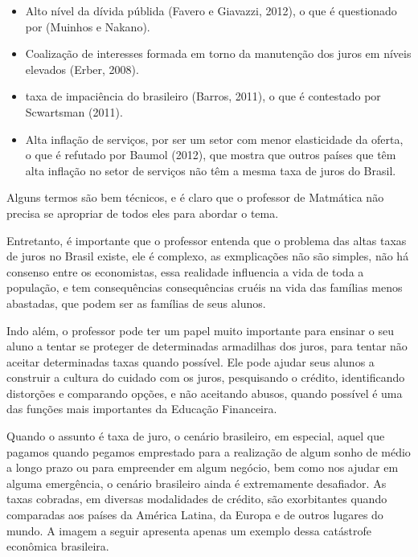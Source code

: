 \begin{paginatexto}
\begin{itemize}
  \item Alto nível da dívida públida (Favero e Giavazzi, 2012), o que é questionado por (Muinhos e Nakano).

  \item  Coalização de interesses formada em torno da manutenção dos juros em níveis elevados (Erber, 2008).

  \item taxa de impaciência do brasileiro (Barros, 2011), o que é contestado por Scwartsman (2011).

  \item Alta inflação de serviços, por ser um setor com menor elasticidade da oferta, o que é refutado por Baumol (2012), que mostra que outros países que têm alta inflação no setor de serviços não têm a mesma taxa de juros do Brasil.
\end{itemize}

Alguns termos são bem técnicos, e é claro que o professor de Matmática não precisa se apropriar de todos eles para abordar o tema.

Entretanto, é importante que o professor entenda que o problema das altas taxas de juros no Brasil existe, ele é complexo, as exmplicações não são simples, não há consenso entre os economistas, essa realidade influencia a vida de toda a população, e tem consequências consequências cruéis na vida das famílias menos abastadas, que podem ser as famílias de seus alunos.

Indo além, o professor pode ter um papel muito importante para ensinar o seu aluno a tentar se proteger de determinadas armadilhas dos juros, para tentar não aceitar determinadas taxas quando possível. Ele pode ajudar seus alunos a construir a cultura do cuidado com os juros, pesquisando o crédito, identificando distorções e comparando opções, e não aceitando abusos, quando possível é uma das funções mais importantes da Educação Financeira.

\end{paginatexto}

\def\currentcolor{session1}




Quando o assunto é taxa de juro, o cenário brasileiro, em  especial, aquel que pagamos quando pegamos emprestado para a realização de algum sonho de médio a longo prazo ou para empreender em algum negócio, bem como nos ajudar em alguma emergência, o cenário brasileiro ainda é extremamente desafiador. As taxas cobradas, em diversas modalidades de crédito, são exorbitantes quando comparadas aos países da América Latina, da Europa e de outros lugares do mundo. A imagem a seguir apresenta apenas um exemplo dessa catástrofe econômica brasileira.

